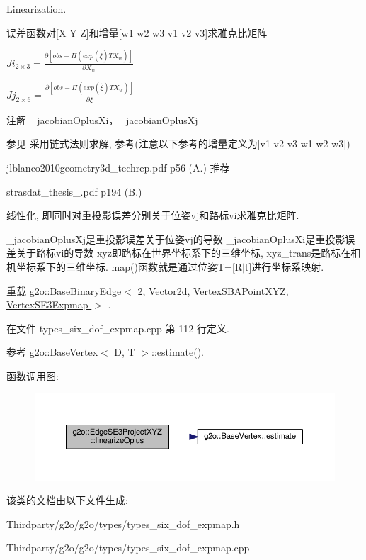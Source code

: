 Linearization. 

误差函数对\mbox{[}X Y Z\mbox{]}和增量\mbox{[}w1 w2 w3 v1 v2 v3\mbox{]}求雅克比矩阵 \par
 $Ji_{2\times3} = \frac{\partial [obs - \Pi(exp(\hat{\xi}) T X_w)]}{\partial X_w} $ \par
 $Jj_{2\times6} = \frac{\partial [obs - \Pi(exp(\hat{\xi}) T X_w)]}{\partial \xi} $ \par
\begin{DoxyNote}{注解}
\-\_\-jacobian\-Oplus\-Xi，\-\_\-jacobian\-Oplus\-Xj 
\end{DoxyNote}
\begin{DoxySeeAlso}{参见}
采用链式法则求解, 参考(注意以下参考的增量定义为\mbox{[}v1 v2 v3 w1 w2 w3\mbox{]})
\begin{DoxyItemize}
\item jlblanco2010geometry3d\-\_\-techrep.\-pdf p56 (A.) 推荐
\item strasdat\-\_\-thesis\-\_.\-pdf p194 (B.)
\end{DoxyItemize}
\end{DoxySeeAlso}
线性化, 即同时对重投影误差分别关于位姿vj和路标vi求雅克比矩阵.

\-\_\-jacobian\-Oplus\-Xj是重投影误差关于位姿vj的导数 \-\_\-jacobian\-Oplus\-Xi是重投影误差关于路标vi的导数 xyz即路标在世界坐标系下的三维坐标, xyz\-\_\-trans是路标在相机坐标系下的三维坐标. map()函数就是通过位姿\-T=\mbox{[}R$\vert$t\mbox{]}进行坐标系映射. 

重载 \hyperlink{classg2o_1_1BaseBinaryEdge_af0fb8a693c8c7996fa65566e7263fbc4}{g2o\-::\-Base\-Binary\-Edge$<$ 2, Vector2d, Vertex\-S\-B\-A\-Point\-X\-Y\-Z, Vertex\-S\-E3\-Expmap $>$} .



在文件 types\-\_\-six\-\_\-dof\-\_\-expmap.\-cpp 第 112 行定义.



参考 g2o\-::\-Base\-Vertex$<$ D, T $>$\-::estimate().



函数调用图\-:
\nopagebreak
\begin{figure}[H]
\begin{center}
\leavevmode
\includegraphics[width=350pt]{classg2o_1_1EdgeSE3ProjectXYZ_a7454e89740635d782c9e4efaef35ec44_cgraph}
\end{center}
\end{figure}




该类的文档由以下文件生成\-:\begin{DoxyCompactItemize}
\item 
Thirdparty/g2o/g2o/types/types\-\_\-six\-\_\-dof\-\_\-expmap.\-h\item 
Thirdparty/g2o/g2o/types/types\-\_\-six\-\_\-dof\-\_\-expmap.\-cpp\end{DoxyCompactItemize}
